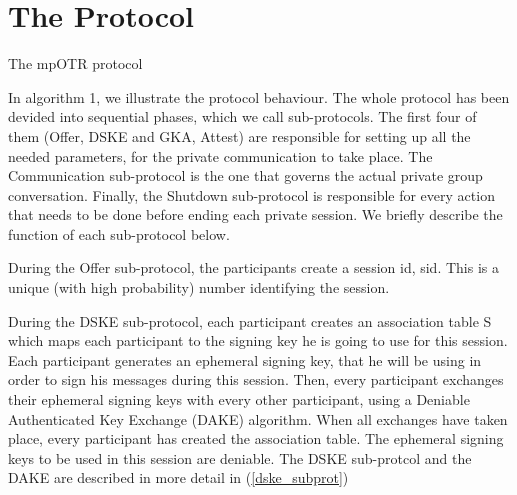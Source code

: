 \documentclass[]{article}
\begin{document}

\section{The Protocol}
\begin{algorithm}[h]
	\caption{The mpOTR protocol}
	\label{mpotr_algo}
\end{algorithm}

In algorithm 1, we illustrate the protocol behaviour.
The whole protocol has been devided into sequential phases, which we call sub-protocols.
The first four of them (Offer, DSKE and GKA, Attest) are responsible for setting up all the needed parameters, for the private communication to take place.
The Communication sub-protocol is the one that governs the actual private group conversation.
Finally, the Shutdown sub-protocol is responsible for every action that needs to be done before ending each private session.
We briefly describe the function of each sub-protocol below.

During the Offer sub-protocol, the participants create a session id, sid.
This is a unique (with high probability) number identifying the session.

During the DSKE sub-protocol, each participant creates an association table S which maps each participant to the signing key he is going to use for this session.
Each participant generates an ephemeral signing key, that he will be using in order to sign his messages during this session.
Then, every participant exchanges their ephemeral signing keys with every other participant, using a Deniable Authenticated Key Exchange (DAKE) algorithm.
When all exchanges have taken place, every participant has created the association table.
The ephemeral signing keys to be used in this session are deniable.
The DSKE sub-protcol and the DAKE are described in more detail in (\ref{dske_subprot})
\end{document}
